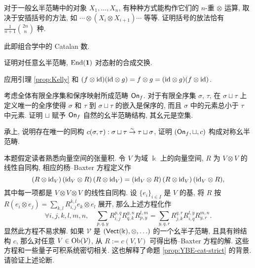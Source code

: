 \begin{Exercises}
	\item 对于一般幺半范畴中的对象 $X_1, \ldots, X_n$, 有种种方式能构作它们的 $n$-重 $\otimes$ 运算, 取决于安插括号的方法, 如 $\cdots \otimes (X_i \otimes X_{i+1}) \cdots$ 等等. 证明括号的放法恰有 $\frac{1}{n+1} \binom{2n}{n}$ 种. \begin{hint} 此即组合学中的 Catalan 数. \end{hint}
	\item 证明对任意幺半范畴, $\operatorname{End}(\mathbf{1})$ 对态射的合成交换. \begin{hint} 应用引理 \ref{prop:Kelly} 和 $(f \otimes \mathrm{id})(\mathrm{id} \otimes g) = f \otimes g = (\mathrm{id} \otimes g) (f \otimes \mathrm{id})$.\end{hint}
	\item 考虑全体有限全序集和保序映射所成范畴 $\mathsf{On}_f$. 对于有限全序集 $\sigma$, $\tau$, 在 $\sigma \sqcup \tau$ 上定义唯一的全序使得 $\sigma$ 和 $\tau$ 到 $\sigma \sqcup \tau$ 的嵌入是保序的, 而且 $\sigma$ 中的元素总小于 $\tau$ 中元素. 证明 $\sqcup$ 赋予 $\mathsf{On}_f$ 自然的幺半范畴结构, 其幺元是空集.
	\item 承上, 说明存在唯一的同构 $c(\sigma, \tau): \sigma \sqcup \tau \stackrel{\sim}{\rightarrow} \tau \sqcup \sigma$, 证明 $(\mathsf{On}_f, \sqcup, c)$ 构成对称幺半范畴.
	\item 本题假定读者熟悉向量空间的张量积. 令 $V$ 为域 $\Bbbk$ 上的向量空间, $R$ 为 $V \otimes V$ 的线性自同构, 相应的杨--Baxter 方程定义作
		\[ (R \otimes \mathrm{id}_V) \, (\mathrm{id}_V \otimes R) \, (R \otimes \mathrm{id}_V) = (\mathrm{id}_V \otimes R) \, (R \otimes \mathrm{id}_V) \, (\mathrm{id}_V \otimes R) , \]
		其中每一项都是 $V \otimes V \otimes V$ 的线性自同构. 设 $\{e_i\}_{i \in I}$ 是 $V$ 的基, 将 $R$ 按 $R(e_i \otimes e_j) = \sum_{k,l} R^{k,l}_{i,j} e_k \otimes e_l$ 展开, 那么上述方程化作
		\[ \forall i,j,k,l,m,n, \quad \sum_{p,q,y} R^{p,q}_{i,j} R^{y,n}_{q,k} R^{l,m}_{p,y} = \sum_{y,q,r} R^{q,r}_{j,k} R^{l,y}_{i,q} R^{m,n}_{y,r}.  \]
		显然此方程不易求解. 如果 $\mathcal{V}$ 是 $(\mathsf{Vect}(\Bbbk), \otimes, \ldots)$ 的一个幺半子范畴, 且具有辫结构 $c$, 那么对任意 $V \in \operatorname{Ob}(\mathcal{V})$, 从 $R := c(V,V)$ 可得出杨--Baxter 方程的解. 这些方程和一些量子可积系统密切相关. 这也解释了命题 \ref{prop:YBE-cat-strict} 的背景. 请验证上述论断.
		

\end{Exercises}
